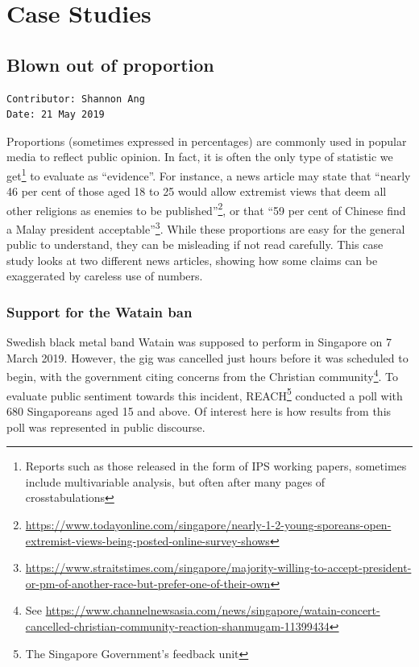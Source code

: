 \documentclass[
  openany]{book}
\begin{document}
\hypertarget{part-case-studies}{%
\part{Case Studies}\label{part-case-studies}}

\hypertarget{oop}{%
\chapter{Blown out of proportion}\label{oop}}

\begin{verbatim}
Contributor: Shannon Ang
Date: 21 May 2019
\end{verbatim}

Proportions (sometimes expressed in percentages) are commonly used in popular media to reflect public opinion. In fact, it is often the only type of statistic we get\footnote{Reports such as those released in the form of IPS working papers, sometimes include multivariable analysis, but often after many pages of crosstabulations} to evaluate as ``evidence''. For instance, a news article may state that ``nearly 46 per cent of those aged 18 to 25 would allow extremist views that deem all other religions as enemies to be published''\footnote{\url{https://www.todayonline.com/singapore/nearly-1-2-young-sporeans-open-extremist-views-being-posted-online-survey-shows}}, or that ``59 per cent of Chinese find a Malay president acceptable''\footnote{\url{https://www.straitstimes.com/singapore/majority-willing-to-accept-president-or-pm-of-another-race-but-prefer-one-of-their-own}}. While these proportions are easy for the general public to understand, they can be misleading if not read carefully. This case study looks at two different news articles, showing how some claims can be exaggerated by careless use of numbers.

\hypertarget{watain}{%
\section{Support for the Watain ban}\label{watain}}

Swedish black metal band Watain was supposed to perform in Singapore on 7 March 2019. However, the gig was cancelled just hours before it was scheduled to begin, with the government citing concerns from the Christian community\footnote{See \url{https://www.channelnewsasia.com/news/singapore/watain-concert-cancelled-christian-community-reaction-shanmugam-11399434}}. To evaluate public sentiment towards this incident, REACH\footnote{The Singapore Government's feedback unit} conducted a poll with 680 Singaporeans aged 15 and above. Of interest here is how results from this poll was represented in public discourse.
\end{document}
